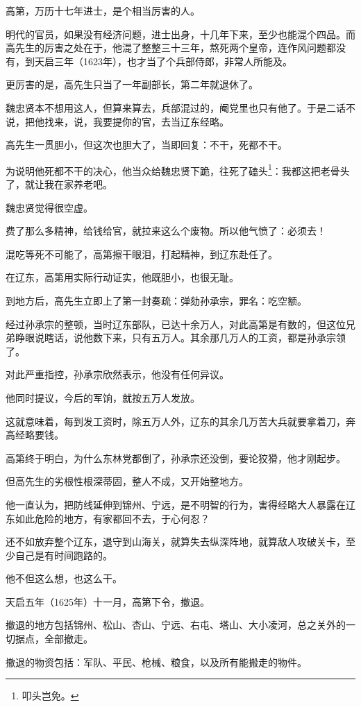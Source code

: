 \begin{multicols}{\theparacolNo}
高第，万历十七年进士，是个相当厉害的人。

明代的官员，如果没有经济问题，进士出身，十几年下来，至少也能混个四品。而高先生的厉害之处在于，他混了整整三十三年，熬死两个皇帝，连作风问题都没有，到天启三年（1623年），也才当了个兵部侍郎，非常人所能及。

更厉害的是，高先生只当了一年副部长，第二年就退休了。

魏忠贤本不想用这人，但算来算去，兵部混过的，阉党里也只有他了。于是二话不说，把他找来，说，我要提你的官，去当辽东经略。

高先生一贯胆小，但这次也胆大了，当即回复：不干，死都不干。

为说明他死都不干的决心，他当众给魏忠贤下跪，往死了磕头\footnote{叩头岂免。}：我都这把老骨头了，就让我在家养老吧。

魏忠贤觉得很空虚。

费了那么多精神，给钱给官，就拉来这么个废物。所以他气愤了：必须去！

混吃等死不可能了，高第擦干眼泪，打起精神，到辽东赴任了。

在辽东，高第用实际行动证实，他既胆小，也很无耻。

到地方后，高先生立即上了第一封奏疏：弹劾孙承宗，罪名：吃空额。

经过孙承宗的整顿，当时辽东部队，已达十余万人，对此高第是有数的，但这位兄弟睁眼说瞎话，说他数下来，只有五万人。其余那几万人的工资，都是孙承宗领了。

对此严重指控，孙承宗欣然表示，他没有任何异议。

他同时提议，今后的军饷，就按五万人发放。

这就意味着，每到发工资时，除五万人外，辽东的其余几万苦大兵就要拿着刀，奔高经略要钱。

高第终于明白，为什么东林党都倒了，孙承宗还没倒，要论狡猾，他才刚起步。

但高先生的劣根性根深蒂固，整人不成，又开始整地方。

他一直认为，把防线延伸到锦州、宁远，是不明智的行为，害得经略大人暴露在辽东如此危险的地方，有家都回不去，于心何忍？

还不如放弃整个辽东，退守到山海关，就算失去纵深阵地，就算敌人攻破关卡，至少自己是有时间跑路的。

他不但这么想，也这么干。

天启五年（1625年）十一月，高第下令，撤退。

撤退的地方包括锦州、松山、杏山、宁远、右屯、塔山、大小凌河，总之关外的一切据点，全部撤走。

撤退的物资包括：军队、平民、枪械、粮食，以及所有能搬走的物件。


\end{multicols}
